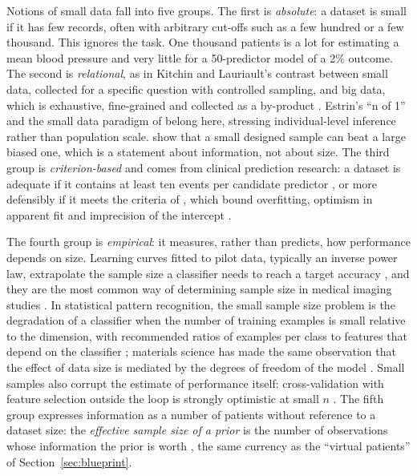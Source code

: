\documentclass[acmsmall,screen,review]{acmart}
\theoremstyle{acmdefinition}
\begin{document}
Notions of small data fall into five groups. The first is \emph{absolute}: a dataset is small if it has few records, often with arbitrary cut-offs such as a few hundred or a few thousand. This ignores the task. One thousand patients is a lot for estimating a mean blood pressure and very little for a 50-predictor model of a 2\% outcome. The second is \emph{relational}, as in Kitchin and Lauriault's contrast between small data, collected for a specific question with controlled sampling, and big data, which is exhaustive, fine-grained and collected as a by-product \cite{kitchin2015small}. Estrin's ``n of 1'' \cite{estrin2014small} and the small data paradigm of \citet{hekler2019we} belong here, stressing individual-level inference rather than population scale. \citet{faraway2018when} show that a small designed sample can beat a large biased one, which is a statement about information, not about size. The third group is \emph{criterion-based} and comes from clinical prediction research: a dataset is adequate if it contains at least ten events per candidate predictor \cite{peduzzi1996simulation}, or more defensibly if it meets the criteria of \citet{riley2019minimumsample}, which bound overfitting, optimism in apparent fit and imprecision of the intercept \cite{riley2020calculating,smeden2019sample}.

The fourth group is \emph{empirical}: it measures, rather than predicts, how performance depends on size. Learning curves fitted to pilot data, typically an inverse power law, extrapolate the sample size a classifier needs to reach a target accuracy \cite{figueroa2012predicting}, and they are the most common way of determining sample size in medical imaging studies \cite{balki2019sample}. In statistical pattern recognition, the small sample size problem is the degradation of a classifier when the number of training examples is small relative to the dimension, with recommended ratios of examples per class to features that depend on the classifier \cite{raudys1991small}; materials science has made the same observation that the effect of data size is mediated by the degrees of freedom of the model \cite{zhang2018strategy,xu2023small}. Small samples also corrupt the estimate of performance itself: cross-validation with feature selection outside the loop is strongly optimistic at small $n$ \cite{vabalas2019machine}. The fifth group expresses information as a number of patients without reference to a dataset size: the \emph{effective sample size of a prior} is the number of observations whose information the prior is worth \cite{morita2008determining}, the same currency as the ``virtual patients'' of Section~\ref{sec:blueprint}.
\end{document}
